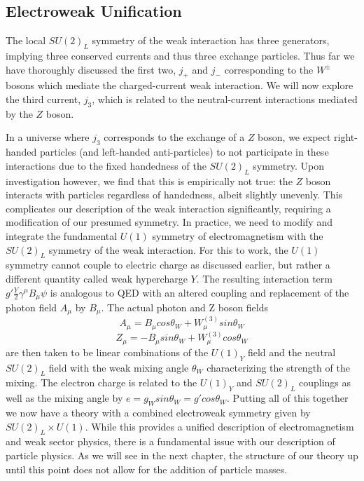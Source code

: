 \subsection{Electroweak Unification}

The local $SU(2)_L$ symmetry of the weak interaction has three generators, implying three conserved currents and 
thus three exchange particles. Thus far we have thoroughly discussed the first two,  $j_+$ and $j_-$ corresponding 
to the $W^{\pm}$ bosons which mediate the charged-current weak interaction. We will now explore the third current, 
$j_3$, which is related to the neutral-current interactions mediated by the $Z$ boson.  \par

In a universe where $j_3$ corresponds to the exchange of a $Z$ boson, we expect right-handed particles (and 
left-handed anti-particles) to not participate in these interactions due to the fixed handedness of the $SU(2)_L$ 
symmetry. Upon investigation however, we find that this is empirically not true: the $Z$ boson interacts with particles 
regardless of handedness, albeit slightly unevenly. This complicates our description of the weak interaction significantly, 
requiring a modification of our presumed symmetry. In practice, we need to modify and integrate the fundamental 
$U(1)$ symmetry of electromagnetism with the $SU(2)_L$ symmetry of the weak interaction. For this to work, the 
$U(1)$ symmetry cannot couple to electric charge as discussed earlier, but rather a different quantity called weak 
hypercharge $Y$. The resulting interaction term $g'\frac{Y}{2}\gamma^{\mu}B_{\mu}\psi$ is analogous to QED with 
an altered coupling and replacement of the photon field $A_{\mu}$ by $B_{\mu}$. The actual photon and Z boson 
fields
\begin{equation}
A_{\mu} = B_{\mu}cos\theta_W + W^{(3)}_{\mu}sin\theta_W
\end{equation}
\begin{equation}
Z_{\mu} = -B_{\mu}sin\theta_W+W^{(3)}_{\mu}cos\theta_W
\end{equation}
are then taken to be linear combinations of the $U(1)_Y$ field and the neutral $SU(2)_L$ field with the weak mixing 
angle $\theta_W$ characterizing the strength of the mixing. The electron charge is related to the $U(1)_Y$ and 
$SU(2)_L$ couplings as well as the mixing angle by $e = g_Wsin\theta_W = g'cos\theta_W$. Putting all of this 
together we now have a theory with a combined electroweak symmetry given by $SU(2)_L \times U(1)$. While 
this provides a unified description of electromagnetism and weak sector physics, there is a fundamental issue with 
our description of particle physics. As we will see in the next chapter, the structure of our theory up until this point 
does not allow for the addition of particle masses.

